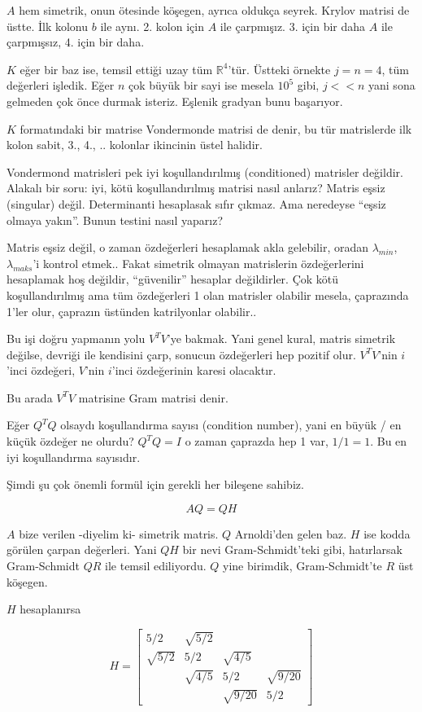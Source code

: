 \documentclass[12pt,fleqn]{article}\usepackage{../../common}
\begin{document}
$A$ hem simetrik, onun ötesinde köşegen, ayrıca oldukça seyrek. Krylov
matrisi de üstte. İlk kolonu $b$ ile aynı. 2. kolon için $A$ ile
çarpmışız. 3. için bir daha $A$ ile çarpmışsız, 4. için bir daha.

$K$ eğer bir baz ise, temsil ettiği uzay tüm $\mathbb{R}^4$'tür. Üstteki
örnekte $j = n = 4$, tüm değerleri işledik. Eğer $n$ çok büyük bir sayi ise
mesela $10^5$ gibi, $j << n$ yani sona gelmeden çok önce durmak
isteriz. Eşlenik gradyan bunu başarıyor. 

$K$ formatındaki bir matrise Vondermonde matrisi de denir, bu tür
matrislerde ilk kolon sabit, 3., 4., .. kolonlar ikincinin üstel 
halidir. 

Vondermond matrisleri pek iyi koşullandırılmış (conditioned) matrisler
değildir. Alakalı bir soru: iyi, kötü koşullandırılmış matrisi nasıl
anlarız? Matris eşsiz (singular) değil. Determinanti hesaplasak sıfır
çıkmaz. Ama neredeyse ``eşsiz olmaya yakın''. Bunun testini nasıl yaparız? 

Matris eşsiz değil, o zaman özdeğerleri hesaplamak akla gelebilir,
oradan $\lambda_{min}$, $\lambda_{maks}$'i kontrol etmek.. Fakat simetrik
olmayan matrislerin özdeğerlerini hesaplamak hoş değildir, ``güvenilir''
hesaplar değildirler. Çok kötü koşullandırılmış ama tüm özdeğerleri 1 olan
matrisler olabilir mesela, çaprazında 1'ler olur, çaprazın üstünden
katrilyonlar olabilir.. 

Bu işi doğru yapmanın yolu $V^TV$'ye bakmak. Yani genel kural, matris
simetrik değilse, devriği ile kendisini çarp, sonucun özdeğerleri hep
pozitif olur. $V^TV$'nin $i$'inci özdeğeri, $V$'nin $i$'inci özdeğerinin
karesi olacaktır. 

Bu arada $V^TV$ matrisine Gram matrisi denir. 

Eğer $Q^TQ$ olsaydı koşullandırma sayısı (condition number), yani en büyük /
en küçük özdeğer ne olurdu? $Q^TQ = I$  o zaman çaprazda hep 1 var, $1/1 =
1$. Bu en iyi koşullandırma sayısıdır. 

Şimdi şu çok önemli formül için gerekli her bileşene sahibiz. 

$$ AQ = QH $$

$A$ bize verilen -diyelim ki- simetrik matris. $Q$ Arnoldi'den gelen
baz. $H$ ise kodda görülen çarpan değerleri. Yani $QH$ bir nevi
Gram-Schmidt'teki gibi, hatırlarsak Gram-Schmidt $QR$ ile temsil
ediliyordu. $Q$ yine birimdik, Gram-Schmidt'te $R$ üst köşegen. 

$H$ hesaplanırsa

$$  H = 
\left[\begin{array}{rrrr}
5/2 & \sqrt{ 5/2} && \\
\sqrt{ 5/2} & 5/2 & \sqrt{ 4/5}& \\
 & \sqrt{ 4/5} & 5/2 & \sqrt{ 9/20}\\
 &&  \sqrt{ 9/20} & 5/2 
\end{array}\right]
$$
\end{document}
